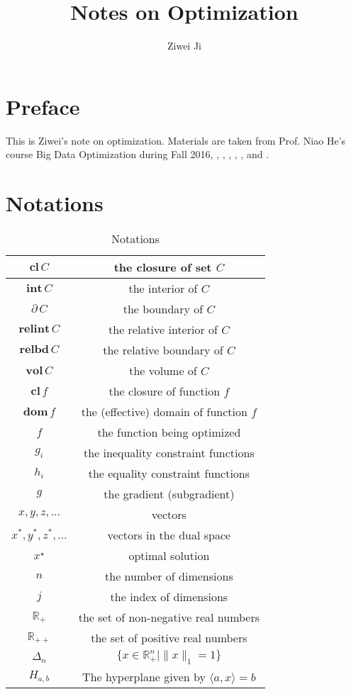 \documentclass[openany]{book}
\author{Ziwei Ji}
\title{Notes on Optimization}
\theoremstyle{definition}
\theoremstyle{remark}
\begin{document}
\maketitle

\tableofcontents

\chapter*{Preface}
This is Ziwei's note on optimization. Materials are taken from Prof. Niao He's course Big Data Optimization during Fall 2016, \cite{R15}, \cite{HL12}, \cite{BL10}, \cite{N13}, \cite{B14}, and \cite{BV04}.

\chapter*{Notations}
\begin{table}[h]
\begin{center}
\begin{tabular}{|c|c|}
\hline
$\mathbf{cl}\,C$ & the closure of set $C$ \\
\hline
$\mathbf{int}\,C$  & the interior of $C$ \\
\hline
$\partial\,C$ & the boundary of $C$ \\
\hline
$\mathbf{relint}\,C$ & the relative interior of $C$ \\
\hline
$\mathbf{relbd}\,C$ & the relative boundary of $C$ \\
\hline
$\mathbf{vol}\,C$ & the volume of $C$ \\
\hline
$\mathbf{cl}\,f$ & the closure of function $f$ \\
\hline
$\mathbf{dom}\,f$ & the (effective) domain of function $f$ \\
\hline
$f$ & the function being optimized \\
\hline
$g_i$ & the inequality constraint functions \\
\hline
$h_i$ & the equality constraint functions \\
\hline
$g$ & the gradient (subgradient) \\
\hline
$x,y,z,\ldots$ & vectors \footnotemark[1] \\
\hline
$x^*,y^*,z^*,\ldots$ & vectors in the dual space \\
\hline
$x^{\star}$ & optimal solution \\
\hline
$n$ & the number of dimensions \\
\hline
$j$ & the index of dimensions \\
\hline
$\mathbb{R}_+$ & the set of non-negative real numbers \\
\hline
$\mathbb{R}_{++}$ & the set of positive real numbers \\
\hline
$\Delta_n$ & $\{x\in \mathbb{R}_+^n|\|x\|_1=1\}$ \\
\hline
$H_{a,b}$ & The hyperplane given by $\langle a,x\rangle=b$ \\
\hline
\end{tabular}
\end{center}
\caption{Notations}
\end{table}
\end{document}
